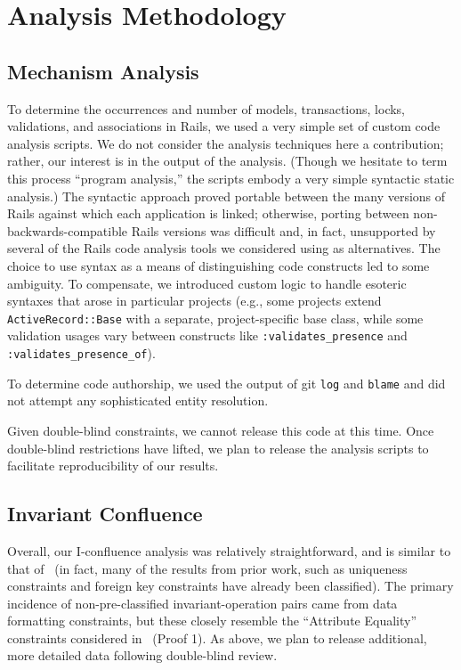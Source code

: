 \section{Analysis Methodology}
\subsection{Mechanism Analysis}
\label{sec:appendix-methodology}

To determine the occurrences and number of models, transactions, locks, validations, and associations in Rails, we used a very simple set of custom code analysis scripts. We do not consider the analysis techniques here a contribution; rather, our interest is in the output of the analysis.  (Though we hesitate to term this process ``program analysis,'' the scripts embody a very simple syntactic static analysis.) The syntactic approach proved portable between the many versions of Rails against which each application is linked; otherwise, porting between non-backwards-compatible Rails versions was difficult and, in fact, unsupported by several of the Rails code analysis tools we considered using as alternatives. The choice to use syntax as a means of distinguishing code constructs led to some ambiguity. To compensate, we introduced custom logic to handle esoteric syntaxes that arose in particular projects (e.g., some projects extend \texttt{ActiveRecord::Base} with a separate, project-specific base class, while some validation usages vary between constructs like \texttt{:validates\_presence} and \texttt{:validates\_presence\_of}).

To determine code authorship, we used the output of git \texttt{log} and \texttt{blame} and did not attempt any sophisticated entity resolution.

Given double-blind constraints, we cannot release this code at this time. Once double-blind restrictions have lifted, we plan to release the analysis scripts to facilitate reproducibility of our results.

\subsection{Invariant Confluence}
\label{sec:appendix-ic}

Overall, our I-confluence analysis was relatively straightforward, and is similar to that of~\cite{coord-avoid} (in fact, many of the results from prior work, such as uniqueness constraints and foreign key constraints have already been classified). The primary incidence of non-pre-classified invariant-operation pairs came from data formatting constraints, but these closely resemble the ``Attribute Equality'' constraints considered in~\cite{coord-avoid} (Proof 1). As above, we plan to release additional, more detailed data following double-blind review.

